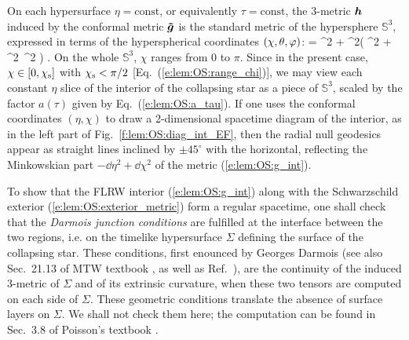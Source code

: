 On each hypersurface $\eta=\mathrm{const}$, or equivalently $\tau = \mathrm{const}$,
the 3-metric $\bm{h}$ induced by
the conformal metric $\bm{\tilde{g}}$ is the standard metric of the hypersphere
$\mathbb{S}^3$, expressed in terms of the hyperspherical coordinates $(\chi,\theta,\varphi)$:
\be
     = \dd\chi^2 + \sin^2\chi \left( \dd\th^2 + \sin^2\th\, \dd\ph^2 \right) .
\ee
On the whole $\mathbb{S}^3$, $\chi$ ranges from $0$ to $\pi$. Since in the
present case, $\chi \in [0,\chi_{\rm s}]$ with $\chi_{\rm s} < \pi/2$
[Eq.~(\ref{e:lem:OS:range_chi})],
we may view each constant $\eta$ slice of the interior of the collapsing
star as a piece of $\mathbb{S}^3$, scaled by the factor $a(\tau)$
given by Eq.~(\ref{e:lem:OS:a_tau}).
If one uses the conformal coordinates $(\eta,\chi)$ to draw a 2-dimensional
spacetime diagram of the interior, as in the left part of Fig.~\ref{f:lem:OS:diag_int_EF},
then the radial null geodesics appear as straight lines inclined by $\pm 45^\circ$
with the horizontal, reflecting the Minkowskian part $- \dd\eta^2 + \dd\chi^2$
of the metric (\ref{e:lem:OS:g_int}).

To show that the FLRW interior (\ref{e:lem:OS:g_int})
along with the Schwarzschild exterior (\ref{e:lem:OS:exterior_metric})
form a regular spacetime, one shall check that the
\emph{Darmois junction conditions}
are fulfilled at the interface between the two regions, i.e. on the
timelike hypersurface $\Sigma$ defining the surface of the collapsing star.
These conditions, first enounced by Georges Darmois \cite{Darmo1927}
(see also Sec.~21.13 of MTW textbook \cite{MisneTW73}, as well as Ref.~\cite{Lake17}),
are the continuity of the induced 3-metric of $\Sigma$ and of
its extrinsic curvature,
when these two tensors are computed on each side of $\Sigma$.
These geometric conditions translate the absence of surface layers on $\Sigma$.
We shall not check them here; the computation can be found in
Sec.~3.8 of Poisson's textbook \cite{Poiss04}.


